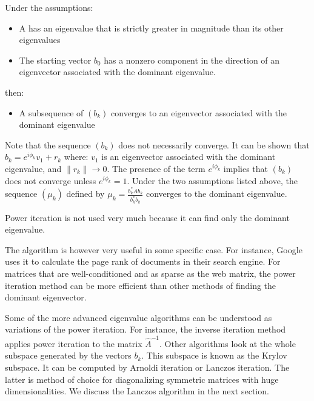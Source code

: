 Under the assumptions:
\begin{itemize}
    \item A has an eigenvalue that is strictly greater in magnitude than its other eigenvalues
    \item The starting vector $b_0$ has a nonzero component in the direction of an eigenvector associated with the dominant eigenvalue.
\end{itemize}
then:
\begin{itemize}
    \item A subsequence of $\left( b_{k} \right)$ converges to an eigenvector associated with the dominant eigenvalue
\end{itemize}
Note that the sequence $\left( b_{k} \right)$ does not necessarily converge. It can be shown that $b_{k} = e^{i \phi_{k}} v_{1} + r_{k}$ where: $v_1$ is an eigenvector associated with the dominant eigenvalue, and $\| r_{k} \| \rightarrow 0$. The presence of the term $e^{i \phi_{k}}$ implies that $\left( b_{k} \right)$ does not converge unless $e^{i \phi_{k}} = 1$. Under the two assumptions listed above, the sequence $\left( \mu_{k} \right)$ defined by $\mu_{k} = \frac{b_{k}^{*}Ab_{k}}{b_{k}^{*}b_{k}}$ converges to the dominant eigenvalue.

Power iteration is not used very much because it can find only the dominant eigenvalue. 

The algorithm is however very useful in some specific case. 
For instance, Google uses it to calculate the page rank of documents in their search engine. For matrices that are well-conditioned and as sparse 
as the web matrix, the power iteration method can be more efficient 
than other methods of finding the dominant eigenvector.

Some of the more advanced eigenvalue algorithms can be understood as variations of the power iteration. For instance, the inverse iteration method applies power iteration to the matrix $\hat{A}^{-1}$. 
Other algorithms look at the whole subspace generated by the vectors $b_k$. 
This subspace is known as the Krylov subspace. 
It can be computed by Arnoldi iteration or Lanczos iteration. The latter is method of choice for diagonalizing symmetric matrices with huge dimensionalities. We discuss the Lanczos algorithm in the next section. 

